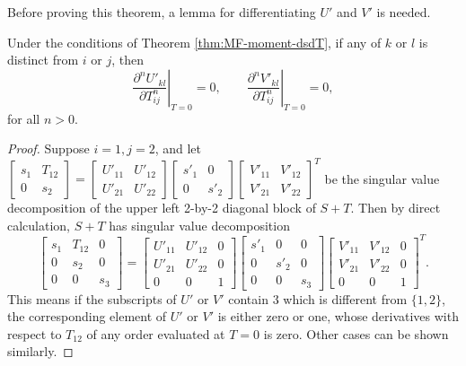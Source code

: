 Before proving this theorem, a lemma for differentiating $U'$ and $V'$ is needed.
\begin{lemma} \label{lemma:MF-moment-dUVdT-zero}
	Under the conditions of Theorem \ref{thm:MF-moment-dsdT}, if any of $k$ or $l$ is distinct from $i$ or $j$, then
	\begin{equation}
		\left. \frac{\partial^n U'_{kl}}{\partial T_{ij}^n} \right|_{T=0} = 0, \qquad
		\left. \frac{\partial^n V'_{kl}}{\partial T_{ij}^n} \right|_{T=0} = 0,
	\end{equation}
	for all $n>0$.
\end{lemma}
\begin{proof}
	Suppose $i=1,j=2$, and let $\begin{bmatrix} s_1 & T_{12} \\ 0 & s_2 \end{bmatrix} = \begin{bmatrix} U'_{11} & U'_{12} \\ U'_{21} & U'_{22} \end{bmatrix} \begin{bmatrix} s'_1 & 0 \\ 0 & s'_2 \end{bmatrix} \begin{bmatrix} V'_{11} & V'_{12} \\ V'_{21} & V'_{22} \end{bmatrix}^T$ be the singular value decomposition of the upper left 2-by-2 diagonal block of $S+T$.
	Then by direct calculation, $S+T$ has singular value decomposition
	\begin{equation*}
		\begin{bmatrix}
			s_1 & T_{12} & 0 \\
			0 & s_2 & 0 \\
			0 & 0 & s_3
		\end{bmatrix} = \begin{bmatrix}
			U'_{11} & U'_{12} & 0 \\
			U'_{21} & U'_{22} & 0 \\
			0 & 0 & 1
		\end{bmatrix} \begin{bmatrix}
			s'_1 & 0 & 0 \\
			0 & s'_2 & 0 \\
			0 & 0 & s_3
		\end{bmatrix} \begin{bmatrix}
			V'_{11} & V'_{12} & 0 \\
			V'_{21} & V'_{22} & 0 \\
			0 & 0 & 1
		\end{bmatrix}^T.
	\end{equation*}
	This means if the subscripts of $U'$ or $V'$ contain $3$ which is different from $\{1,2\}$, the corresponding element of $U'$ or $V'$ is either zero or one, whose derivatives with respect to $T_{12}$ of any order evaluated at $T=0$ is zero.
	Other cases can be shown similarly.
\end{proof}


